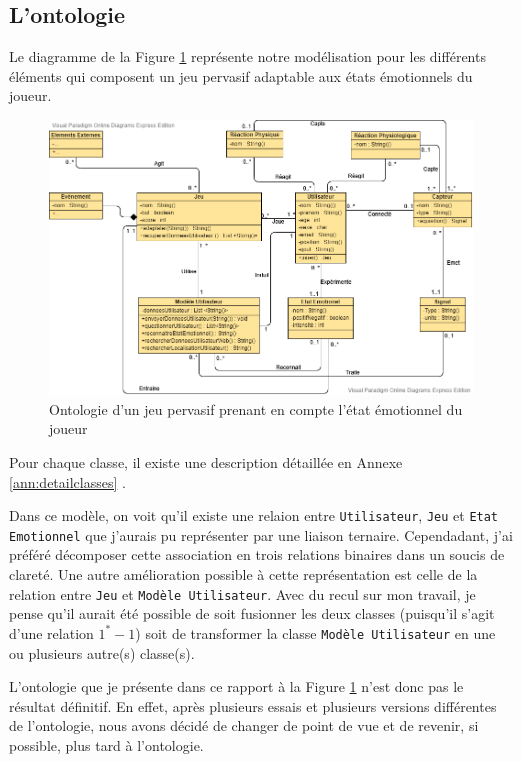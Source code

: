 \documentclass{article}
\begin{document}
	\subsection{L'ontologie}
		Le diagramme de la Figure \ref{fig:modele} représente notre modélisation pour les différents éléments qui composent un jeu pervasif adaptable aux états émotionnels du joueur. 
		\begin{figure}
			\centering
			\includegraphics[scale=0.5]{../include/ontologie_stage_cnam-v2-5.png}
			\caption{Ontologie d'un jeu pervasif prenant en compte l'état émotionnel du joueur}
			\label{fig:modele}
		\end{figure}
		Pour chaque classe, il existe une description détaillée en Annexe \ref{ann:detailclasses}
		.\par
		Dans ce modèle, on voit qu'il existe une relaion entre \texttt{Utilisateur}, \texttt{Jeu} et \texttt{Etat Emotionnel} que j'aurais pu représenter par une liaison ternaire.
		Cependadant, j'ai préféré décomposer cette association en trois relations binaires dans un soucis de clareté. 
		Une autre amélioration possible à cette représentation est celle de la relation entre \texttt{Jeu} et \texttt{Modèle Utilisateur}. 
		Avec du recul sur mon travail, je pense qu'il aurait été possible de soit fusionner les deux classes (puisqu'il s'agit d'une relation $1^* - 1$) soit de transformer la classe \texttt{Modèle Utilisateur} en une ou plusieurs autre(s) classe(s).\par
		L'ontologie que je présente dans ce rapport à la Figure \ref{fig:modele} n'est donc pas le résultat définitif.
		En effet, après plusieurs essais et plusieurs versions différentes de l'ontologie, nous avons décidé de changer de point de vue et de revenir, si possible, plus tard à l'ontologie.
\end{document}
